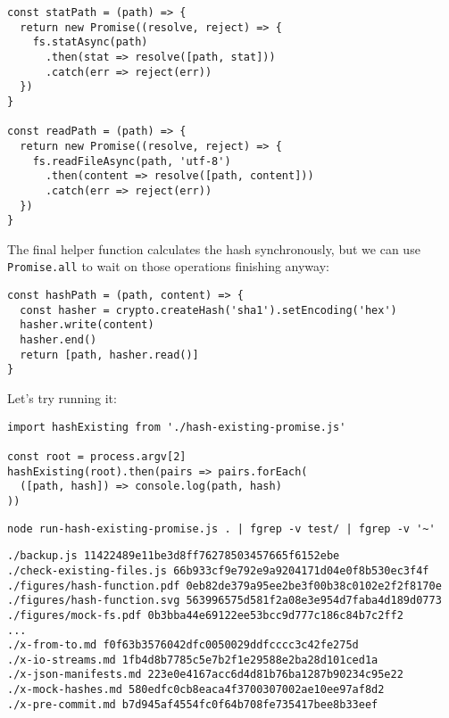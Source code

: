 \documentclass[krantzl]{krantz}
\begin{document}
\begin{lstlisting}[frame=single,frameround=tttt]
const statPath = (path) => {
  return new Promise((resolve, reject) => {
    fs.statAsync(path)
      .then(stat => resolve([path, stat]))
      .catch(err => reject(err))
  })
}

const readPath = (path) => {
  return new Promise((resolve, reject) => {
    fs.readFileAsync(path, 'utf-8')
      .then(content => resolve([path, content]))
      .catch(err => reject(err))
  })
}
\end{lstlisting}



The final helper function calculates the hash synchronously,
but we can use \texttt{Promise.all} to wait on those operations finishing anyway:


\begin{lstlisting}[frame=single,frameround=tttt]
const hashPath = (path, content) => {
  const hasher = crypto.createHash('sha1').setEncoding('hex')
  hasher.write(content)
  hasher.end()
  return [path, hasher.read()]
}
\end{lstlisting}



Let's try running it:


\begin{lstlisting}[frame=single,frameround=tttt]
import hashExisting from './hash-existing-promise.js'

const root = process.argv[2]
hashExisting(root).then(pairs => pairs.forEach(
  ([path, hash]) => console.log(path, hash)
))
\end{lstlisting}



\begin{lstlisting}[frame=single,frameround=tttt]
node run-hash-existing-promise.js . | fgrep -v test/ | fgrep -v '~'
\end{lstlisting}



\begin{lstlisting}[frame=single,frameround=tttt]
./backup.js 11422489e11be3d8ff76278503457665f6152ebe
./check-existing-files.js 66b933cf9e792e9a9204171d04e0f8b530ec3f4f
./figures/hash-function.pdf 0eb82de379a95ee2be3f00b38c0102e2f2f8170e
./figures/hash-function.svg 563996575d581f2a08e3e954d7faba4d189d0773
./figures/mock-fs.pdf 0b3bba44e69122ee53bcc9d777c186c84b7c2ff2
...
./x-from-to.md f0f63b3576042dfc0050029ddfcccc3c42fe275d
./x-io-streams.md 1fb4d8b7785c5e7b2f1e29588e2ba28d101ced1a
./x-json-manifests.md 223e0e4167acc6d4d81b76ba1287b90234c95e22
./x-mock-hashes.md 580edfc0cb8eaca4f3700307002ae10ee97af8d2
./x-pre-commit.md b7d945af4554fc0f64b708fe735417bee8b33eef
\end{lstlisting}
\end{document}

